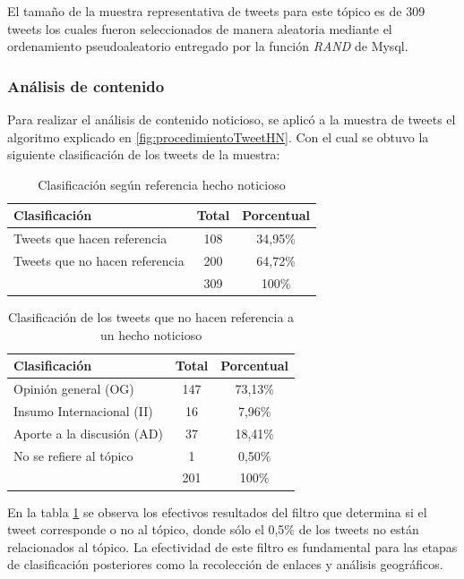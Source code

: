 El tamaño de la muestra representativa de tweets para este tópico es de 309 tweets los cuales fueron seleccionados de manera aleatoria mediante el ordenamiento pseudoaleatorio entregado por la función \emph{RAND} de Mysql. \\

\subsubsection{Análisis de contenido}

Para realizar el análisis de contenido noticioso, se aplicó a la muestra de tweets el algoritmo explicado en \ref{fig:procedimientoTweetHN}. Con el cual se obtuvo la siguiente clasificación de los tweets de la muestra:

\begin{table}[h]
	\centering
	\begin{tabular}{| l | c | c |}
		\hline
		Clasificación    & Total & Porcentual\\ \hline
		Tweets que hacen referencia    & 108 & 34,95\%\\ \hline
		Tweets que no hacen referencia & 200 & 64,72\%\\ \hline
		    & 309 & 100\% \\
		\hline
	\end{tabular}
	\caption {Clasificación según referencia hecho noticioso}
\end{table}

\begin{table}[h]
	\centering
	\begin{tabular}{| l | c | c |}
		\hline
		Clasificación    & Total & Porcentual\\ \hline
		Opinión general (OG)  & 147 & 73,13\% \\ \hline
		Insumo Internacional (II) & 16 & 7,96\% \\ \hline
		Aporte a la discusión (AD) & 37 & 18,41\%\\ \hline
		No se refiere al tópico & 1 & 0,50\% \\ \hline
		& 201 & 100\% \\
		\hline
	\end{tabular}
	\caption {Clasificación de los tweets que no hacen referencia a un hecho noticioso}
	\label{clasifTweetsNoHechoNoticioso}
\end{table}

En la tabla \ref{clasifTweetsNoHechoNoticioso} se observa los efectivos resultados del filtro que determina si el tweet corresponde o no al tópico, donde sólo el 0,5\% de los tweets no están relacionados al tópico. La efectividad de este filtro  es fundamental para las etapas de clasificación
posteriores como la recolección de enlaces y análisis geográficos. 

